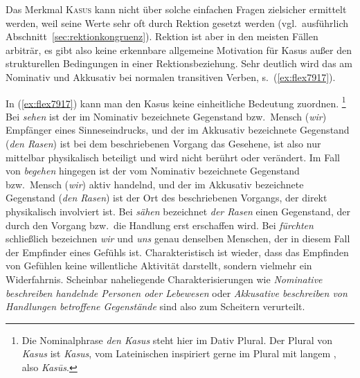 Das Merkmal \textsc{Kasus} kann nicht über solche einfachen Fragen zielsicher ermittelt werden, weil seine Werte sehr oft durch Rektion gesetzt werden (vgl.\ ausführlich Abschnitt~\ref{sec:rektionkongruenz}).
Rektion ist aber in den meisten Fällen arbiträr, es gibt also keine erkennbare allgemeine Motivation für Kasus außer den strukturellen Bedingungen in einer Rektionsbeziehung.
Sehr deutlich wird das am Nominativ und Akkusativ bei normalen transitiven Verben, s.\ (\ref{ex:flex7917}).

\begin{exe}
  \ex \label{ex:flex7917}
  \begin{xlist}
  \end{xlist}
\end{exe}


In (\ref{ex:flex7917}) kann man den Kasus keine einheitliche Bedeutung zuordnen.%
\footnote{Die Nominalphrase \textit{den Kasus} steht hier im Dativ Plural.
Der Plural von \textit{Kasus} ist \textit{Kasus}, vom Lateinischen inspiriert gerne im Plural mit langem \textipa{[u:]}, also \textit{Kas\=us}.}
Bei \textit{sehen} ist der im Nominativ bezeichnete Gegenstand bzw.\ Mensch (\textit{wir}) Empfänger eines Sinneseindrucks, und der im Akkusativ bezeichnete Gegenstand (\textit{den Rasen}) ist bei dem beschriebenen Vorgang das Gesehene, ist also nur mittelbar physikalisch beteiligt und wird nicht berührt oder verändert.
Im Fall von \textit{begehen} hingegen ist der vom Nominativ bezeichnete Gegenstand bzw.\ Mensch (\textit{wir}) aktiv handelnd, und der im Akkusativ bezeichnete Gegenstand (\textit{den Rasen}) ist der Ort des beschriebenen Vorgangs, der direkt physikalisch involviert ist.
Bei \textit{sähen} bezeichnet \textit{der Rasen} einen Gegenstand, der durch den Vorgang bzw.\ die Handlung erst erschaffen wird.
Bei \textit{fürchten} schließlich bezeichnen \textit{wir} und \textit{uns} genau denselben Menschen, der in diesem Fall der Empfinder eines Gefühls ist.
Charakteristisch ist wieder, dass das Empfinden von Gefühlen keine willentliche Aktivität darstellt, sondern vielmehr ein Widerfahrnis.
Scheinbar naheliegende Charakterisierungen wie \textit{Nominative beschreiben handelnde Personen oder Lebewesen} oder \textit{Akkusative beschreiben von Handlungen betroffene Gegenstände} sind also zum Scheitern verurteilt.


